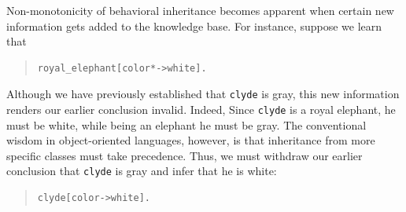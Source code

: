 \documentclass[11pt]{article}
\begin{document}
Non-monotonicity of behavioral inheritance becomes apparent when certain new
information gets added to the knowledge base. For instance, suppose we
learn that
\begin{quote}
\begin{verbatim}
royal_elephant[color*->white].  
\end{verbatim}
\end{quote}
Although we have previously established that {\tt clyde} is gray, this
new information renders our earlier conclusion invalid. Indeed, Since
{\tt clyde} is a royal elephant, he must be white, while being an
elephant he must be gray.  The conventional wisdom in object-oriented
languages, however, is that inheritance from more specific classes
must take precedence. Thus, we must withdraw our earlier conclusion
that {\tt clyde} is gray and infer that he is white:
\begin{quote}
\begin{verbatim}
clyde[color->white].    
\end{verbatim}
\end{quote}
\end{document}
